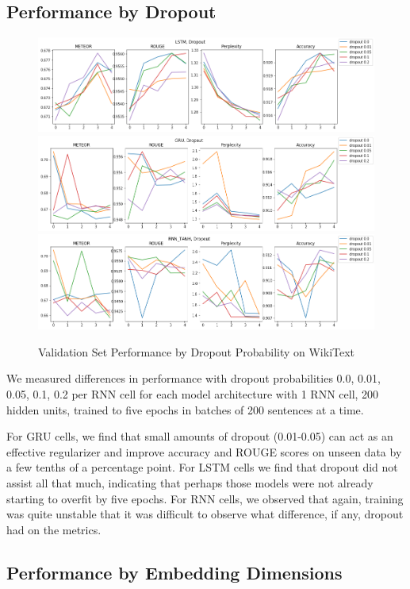 \documentclass[a4paper]{article}
\begin{document}
\subsection{Performance by Dropout}
\label{sec:perf_by_dropout}

\begin{figure}[!ht]
\includegraphics[width=0.7\columnwidth]{sr-perf-by-dropout-lstm}
\includegraphics[width=0.7\columnwidth]{sr-perf-by-dropout-gru}
\includegraphics[width=0.7\columnwidth]{sr-perf-by-dropout-rnn}
\centering
\caption{Validation Set Performance by Dropout Probability on WikiText}
\end{figure}

We measured differences in performance with dropout probabilities
0.0, 0.01, 0.05, 0.1, 0.2 per RNN cell for each model architecture with
1 RNN cell, 200 hidden units, trained to five epochs in batches of 200
sentences at a time.

For GRU cells, we find that small amounts of dropout (0.01-0.05) can act
as an effective regularizer and improve accuracy and ROUGE scores on unseen
data by a few tenths of a percentage point. For LSTM cells we find that
dropout did not assist all that much, indicating that perhaps those models were
not already starting to overfit by five epochs. For RNN cells, we observed
that again, training was quite unstable that it was difficult to observe what
difference, if any, dropout had on the metrics.

\subsection{Performance by Embedding Dimensions}
\label{sec:perf_by_embedding}
\end{document}
